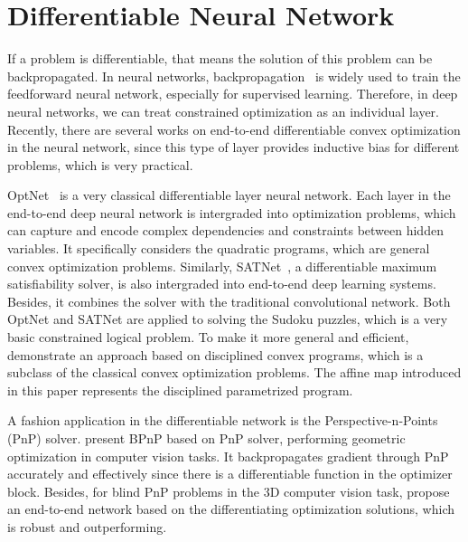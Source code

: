 \section{Differentiable Neural Network}
\label{sec:differentiable}
If a problem is differentiable, that means the solution of this problem can be backpropagated. In neural networks, backpropagation~\citep{GI:16} is widely used to train the feedforward neural network, especially for supervised learning. Therefore, in deep neural networks, we can treat constrained optimization as an individual layer. Recently, there are several works on end-to-end differentiable convex optimization in the neural network, since this type of layer provides inductive bias for different problems, which is very practical. 
\par OptNet~\citep{AB:17} is a very classical differentiable layer neural network. Each layer in the end-to-end deep neural network is intergraded into optimization problems, which can capture and encode complex dependencies and constraints between hidden variables. It specifically considers the quadratic programs, which are general convex optimization problems. Similarly, SATNet~\citep{WP:19}, a differentiable maximum satisfiability solver, is also intergraded into end-to-end deep learning systems. Besides, it combines the solver with the traditional convolutional network. Both OptNet and SATNet are applied to solving the Sudoku puzzles, which is a very basic constrained logical problem. To make it more general and efficient, \cite{AA:19} demonstrate an approach based on disciplined convex programs, which is a subclass of the classical convex optimization problems. The affine map introduced in this paper represents the disciplined parametrized program. 
\par A fashion application in the differentiable network is the Perspective-n-Points (PnP) solver. \cite{CB:20} present BPnP based on PnP solver, performing geometric optimization in computer vision tasks. It backpropagates gradient through PnP accurately and effectively since there is a differentiable function in the optimizer block. Besides, for blind PnP problems in the 3D computer vision task, \cite{CD:20} propose an end-to-end network based on the differentiating optimization solutions, which is robust and outperforming.  

